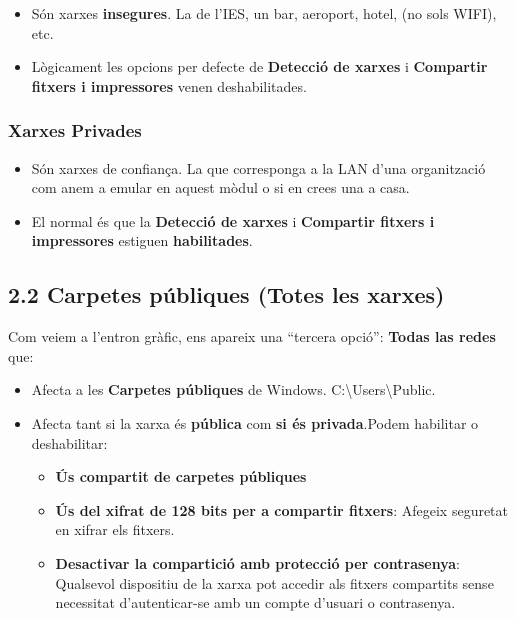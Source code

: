 \documentclass[
  a4paper,
]{article}
\providecommand{\tightlist}{%
  \setlength{\itemsep}{0pt}\setlength{\parskip}{0pt}}
\begin{document}
\begin{itemize}
\tightlist
\item
  Són xarxes \textbf{insegures}. La de l'IES, un bar, aeroport, hotel,
  (no sols WIFI), etc.
\item
  Lògicament les opcions per defecte de \textbf{Detecció de xarxes} i
  \textbf{Compartir fitxers i impressores} venen deshabilitades.
\end{itemize}

\subsubsection{\texorpdfstring{\textbf{Xarxes
Privades}}{Xarxes Privades}}\label{xarxes-privades}

\begin{itemize}
\tightlist
\item
  Són xarxes de confiança. La que corresponga a la LAN d'una
  organització com anem a emular en aquest mòdul o si en crees una a
  casa.
\item
  El normal és que la \textbf{Detecció de xarxes} i \textbf{Compartir
  fitxers i impressores} estiguen \textbf{habilitades}.
\end{itemize}

\subsection{2.2 Carpetes públiques (Totes les
xarxes)}\label{carpetes-puxfabliques-totes-les-xarxes}

Com veiem a l'entron gràfic, ens apareix una ``tercera opció'':
\textbf{Todas las redes} que:

\begin{itemize}
\tightlist
\item
  Afecta a les \textbf{Carpetes públiques} de Windows.
  C:\textbackslash Users\textbackslash Public.
\item
  Afecta tant si la xarxa és \textbf{pública} com \textbf{si és
  privada}.Podem habilitar o deshabilitar:

  \begin{itemize}
  \tightlist
  \item
    \textbf{Ús compartit de carpetes públiques}
  \item
    \textbf{Ús del xifrat de 128 bits per a compartir fitxers}: Afegeix
    seguretat en xifrar els fitxers.
  \item
    \textbf{Desactivar la compartició amb protecció per contrasenya}:
    Qualsevol dispositiu de la xarxa pot accedir als fitxers compartits
    sense necessitat d'autenticar-se amb un compte d'usuari o
    contrasenya.
  \end{itemize}
\end{itemize}
\end{document}
